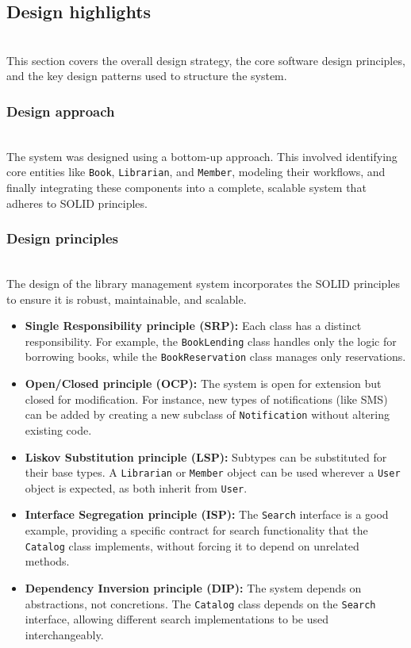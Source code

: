 \subsection{Design highlights}\label{x6Yh0VcIE67hLz3CXYm8S}
\\
This section covers the overall design strategy, the core software design principles, and the key design patterns used to structure the system.

\subsubsection{Design approach}\label{tPPo_FH_5ZkphXcJ5ELjo}
\\
The system was designed using a bottom-up approach. This involved identifying core entities like \texttt{Book}, \texttt{Librarian}, and \texttt{Member}, modeling their workflows, and finally integrating these components into a complete, scalable system that adheres to SOLID principles.

\subsubsection{Design principles}\label{n-A_qf04hsHmycuNbRwXX}
\\
The design of the library management system incorporates the SOLID principles to ensure it is robust, maintainable, and scalable.

\begin{itemize}
\item
\protect{}\label{3bSejmhK9-OAwVhKGtfL_}
\textbf{Single Responsibility principle (SRP):} Each class has a distinct responsibility. For example, the \texttt{BookLending} class handles only the logic for borrowing books, while the \texttt{BookReservation} class manages only reservations.
\item
\protect{}\label{jlgwaav1J4iD4nMvlrp2N}
\textbf{Open/Closed principle (OCP):} The system is open for extension but closed for modification. For instance, new types of notifications (like SMS) can be added by creating a new subclass of \texttt{Notification} without altering existing code.
\item
\protect{}\label{RaxII7gDgjvuHpX8KjRPU}
\textbf{Liskov Substitution principle (LSP):} Subtypes can be substituted for their base types. A \texttt{Librarian} or \texttt{Member} object can be used wherever a \texttt{User} object is expected, as both inherit from \texttt{User}.
\item
\protect{}\label{yqfNoMYpf7iAiIxRN8dsL}
\textbf{Interface Segregation principle (ISP):} The \texttt{Search} interface is a good example, providing a specific contract for search functionality that the \texttt{Catalog} class implements, without forcing it to depend on unrelated methods.
\item
\protect{}\label{d9SZsSs-lXMkFXb1AwfHe}
\textbf{Dependency Inversion principle (DIP):} The system depends on abstractions, not concretions. The \texttt{Catalog} class depends on the \texttt{Search} interface, allowing different search implementations to be used interchangeably.
\end{itemize}

